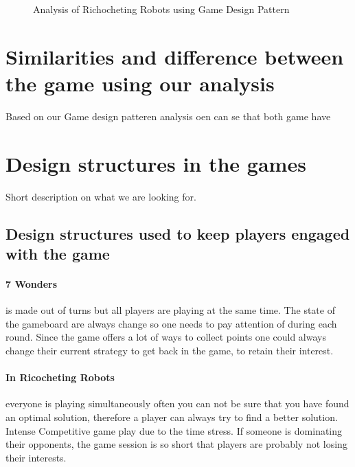 \documentclass[a4paper]{article}
\begin{document}
\begin{figure}[h!]

  \caption{Analysis of Richocheting Robots using Game Design Pattern} 
  \label{fig:RRW}
\end{figure}

\section{Similarities and difference between the game using our analysis}
  Based on our Game design patteren analysis oen can se that both game have 

\section{Design structures in the games}
Short description on what we are looking for.

\subsection{Design structures used to keep players engaged with the game}
\paragraph{7 Wonders} is made out of turns but all players are playing at the same time. The state of the gameboard are always change so one needs to pay attention of during each round. Since the game offers a lot of ways to collect points one could always change their current strategy to get back in the game, to retain their interest.

\paragraph{In Ricocheting Robots} everyone is playing simultaneously often you can not be sure that you have found an optimal solution, therefore a player can always try to find a better solution. Intense Competitive game play due to the time stress. If someone is dominating their opponents, the game session is so short that players are probably not losing their interests.
\end{document}
